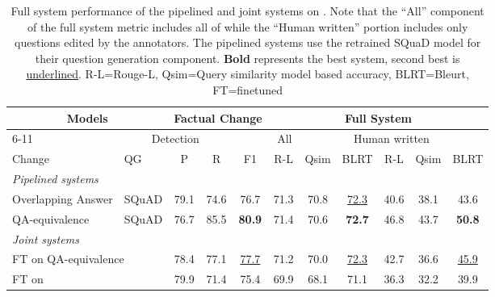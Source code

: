 \begin{table*}[ht]
\begin{center}

\begin{tabular}{ll|ccc|ccc|ccc}
\multicolumn{2}{c|}{\multirow{2}{*}{Models}} & \multicolumn{3}{c|}{\multirow{2}{*}{Factual Change}} & \multicolumn{6}{c}{Full System} \\
\cmidrule(lr){6-11}
\multicolumn{2}{c|}{} & \multicolumn{3}{c|}{Detection} & \multicolumn{3}{|c}{All} & \multicolumn{3}{|c}{Human written} \\
\midrule
Change & QG & P & R & F1 & R-L & Qsim & BLRT & R-L & Qsim & BLRT \\
\midrule
\emph{Pipelined systems} & \\
Overlapping Answer & SQuAD & 79.1 & 74.6 & 76.7 & 71.3 & 70.8 & \underline{72.3} & 40.6 & 38.1 & 43.6 \\
QA-equivalence  & SQuAD & 76.7 & 85.5 & \textbf{80.9} & 71.4 & 70.6 & \textbf{72.7} & 46.8 & 43.7 & \textbf{50.8} \\
\midrule
\emph{Joint systems} & \\
\multicolumn{2}{l|}{FT on QA-equivalence} & 78.4 & 77.1 & \underline{77.7} & 71.2 & 70.0 & \underline{72.3} & 42.7 & 36.6 & \underline{45.9} \\
\multicolumn{2}{l|}{FT on \vitaminc{}} & 79.9 & 71.4 & 75.4 & 69.9 & 68.1 & 71.1 & 36.3 & 32.2 & 39.9 \\
\bottomrule
\end{tabular}

\caption{Full system performance of the pipelined and joint systems on \dataset{}. Note that the ``All'' component of the full system metric includes all of \dataset{} while the ``Human written'' portion includes only questions edited by the annotators. The pipelined systems use the retrained SQuaD model for their question generation component. \textbf{Bold} represents the best system, second best is \underline{underlined}. R-L=Rouge-L, Qsim=Query similarity model based accuracy, BLRT=Bleurt, FT=finetuned}
\label{tab:overall}

\end{center}
\end{table*}

